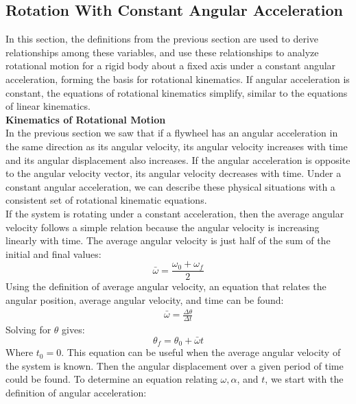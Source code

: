 \documentclass[a4paper]{article}
\let\bf\textbf
\begin{document}
\newpage
\subsection{Rotation With Constant Angular Acceleration}
In this section, the definitions from the previous section are used to derive relationships among these variables, and use these relationships to analyze rotational motion for a rigid body about a fixed axis under a constant angular acceleration, forming the basis for rotational kinematics. If angular acceleration is constant, the equations of rotational kinematics simplify, similar to the equations of linear kinematics. 
\vspace{2mm}\\
\bf{Kinematics of Rotational Motion}
\vspace{2mm}\\
In the previous section we saw that if a flywheel has an angular acceleration in the same direction as its angular velocity, its angular velocity increases with time and its angular displacement also increases. If the angular acceleration is opposite to the angular velocity vector, its angular velocity decreases with time. Under a constant angular acceleration, we can describe these physical situations with a consistent set of rotational kinematic equations.
\vspace{2mm}\\
If the system is rotating under a constant acceleration, then the average angular velocity follows a simple relation because the angular velocity is increasing linearly with time. The average angular velocity is just half of the sum of the initial and final values:
\begin{equation}
    \bar{\omega} = \frac{\omega_0 + \omega_f}{2}
\end{equation}
Using the definition of average angular velocity, an equation that relates the angular position, average angular velocity, and time can be found:
\begin{align*}
    \bar{\omega} = \frac{\Delta\theta}{\Delta t}
\end{align*}
Solving for $\theta$ gives:
\begin{equation}
    \theta_f = \theta_0 + \bar{\omega}t
\end{equation}
Where $t_0 = 0$. This equation can be useful when the average angular velocity of the system is known. Then the angular displacement over a given period of time could be found. To determine an equation relating $\omega, \alpha$, and $t$, we start with the definition of angular acceleration:
\end{document}
